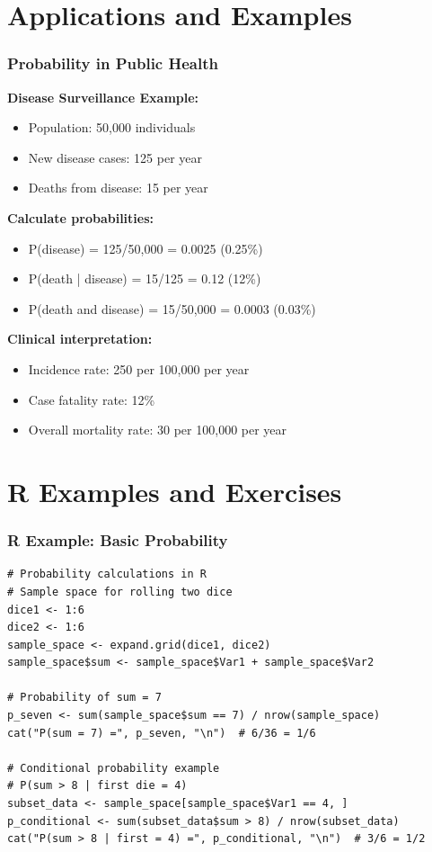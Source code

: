 \documentclass{beamer}
\begin{document}
\section{Applications and Examples}

\begin{frame}
\frametitle{Probability in Public Health}
\textbf{Disease Surveillance Example:}
\begin{itemize}
\item Population: 50,000 individuals
\item New disease cases: 125 per year
\item Deaths from disease: 15 per year
\end{itemize}

\vspace{0.5cm}
\textbf{Calculate probabilities:}
\begin{itemize}
\item P(disease) = 125/50,000 = 0.0025 (0.25\%)
\item P(death | disease) = 15/125 = 0.12 (12\%)
\item P(death and disease) = 15/50,000 = 0.0003 (0.03\%)
\end{itemize}

\vspace{0.5cm}
\textbf{Clinical interpretation:}
\begin{itemize}
\item Incidence rate: 250 per 100,000 per year
\item Case fatality rate: 12\%
\item Overall mortality rate: 30 per 100,000 per year
\end{itemize}
\end{frame}

\section{R Examples and Exercises}

\begin{frame}[fragile]
\frametitle{R Example: Basic Probability}
\small
\begin{verbatim}
# Probability calculations in R
# Sample space for rolling two dice
dice1 <- 1:6
dice2 <- 1:6
sample_space <- expand.grid(dice1, dice2)
sample_space$sum <- sample_space$Var1 + sample_space$Var2

# Probability of sum = 7
p_seven <- sum(sample_space$sum == 7) / nrow(sample_space)
cat("P(sum = 7) =", p_seven, "\n")  # 6/36 = 1/6

# Conditional probability example
# P(sum > 8 | first die = 4)
subset_data <- sample_space[sample_space$Var1 == 4, ]
p_conditional <- sum(subset_data$sum > 8) / nrow(subset_data)
cat("P(sum > 8 | first = 4) =", p_conditional, "\n")  # 3/6 = 1/2
\end{verbatim}
\end{frame}
\end{document}
